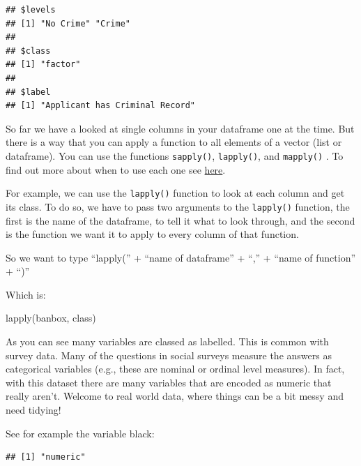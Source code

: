 \documentclass[
]{book}
\newenvironment{Shaded}{\begin{snugshade}}{\end{snugshade}}
\newcommand{\FunctionTok}[1]{\textcolor[rgb]{0.00,0.00,0.00}{#1}}
\newcommand{\NormalTok}[1]{#1}
\newcommand{\SpecialCharTok}[1]{\textcolor[rgb]{0.00,0.00,0.00}{#1}}
\begin{document}
\begin{verbatim}
## $levels
## [1] "No Crime" "Crime"   
## 
## $class
## [1] "factor"
## 
## $label
## [1] "Applicant has Criminal Record"
\end{verbatim}

So far we have a looked at single columns in your dataframe one at the time. But there is a way that you can apply a function to all elements of a vector (list or dataframe). You can use the functions \texttt{sapply()}, \texttt{lapply()}, and \texttt{mapply()} . To find out more about when to use each one see \href{https://www.r-bloggers.com/using-apply-sapply-lapply-in-r/}{here}.

For example, we can use the \texttt{lapply()} function to look at each column and get its class. To do so, we have to pass two arguments to the \texttt{lapply()} function, the first is the name of the dataframe, to tell it what to look through, and the second is the function we want it to apply to every column of that function.

So we want to type ``lapply('' + ``name of dataframe'' + ``,'' + ``name of function'' + ``)''

Which is:

\begin{Shaded}
\begin{Highlighting}[]
\FunctionTok{lapply}\NormalTok{(banbox, class)}
\end{Highlighting}
\end{Shaded}

As you can see many variables are classed as labelled. This is common with survey data. Many of the questions in social surveys measure the answers as categorical variables (e.g., these are nominal or ordinal level measures). In fact, with this dataset there are many variables that are encoded as numeric that really aren't. Welcome to real world data, where things can be a bit messy and need tidying!

See for example the variable black:

\begin{Shaded}
\end{Shaded}

\begin{verbatim}
## [1] "numeric"
\end{verbatim}
\end{document}
